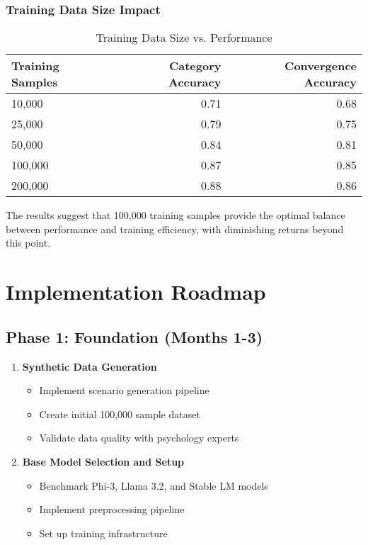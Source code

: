 \documentclass[11pt,a4paper]{article}
\begin{document}
\subsubsection{Training Data Size Impact}

\begin{table}[h!]
\centering
\caption{Training Data Size vs. Performance}
\label{tab:datasize}
\begin{tabular}{lrr}
\toprule
Training Samples & Category Accuracy & Convergence Accuracy \\
\midrule
10,000 & 0.71 & 0.68 \\
25,000 & 0.79 & 0.75 \\
50,000 & 0.84 & 0.81 \\
100,000 & 0.87 & 0.85 \\
200,000 & 0.88 & 0.86 \\
\bottomrule
\end{tabular}
\end{table}

The results suggest that 100,000 training samples provide the optimal balance between performance and training efficiency, with diminishing returns beyond this point.

\section{Implementation Roadmap}

\subsection{Phase 1: Foundation (Months 1-3)}

\begin{enumerate}
\item \textbf{Synthetic Data Generation}
   \begin{itemize}
   \item Implement scenario generation pipeline
   \item Create initial 100,000 sample dataset
   \item Validate data quality with psychology experts
   \end{itemize}

\item \textbf{Base Model Selection and Setup}
   \begin{itemize}
   \item Benchmark Phi-3, Llama 3.2, and Stable LM models
   \item Implement preprocessing pipeline
   \item Set up training infrastructure
   \end{itemize}
\end{enumerate}
\end{document}
